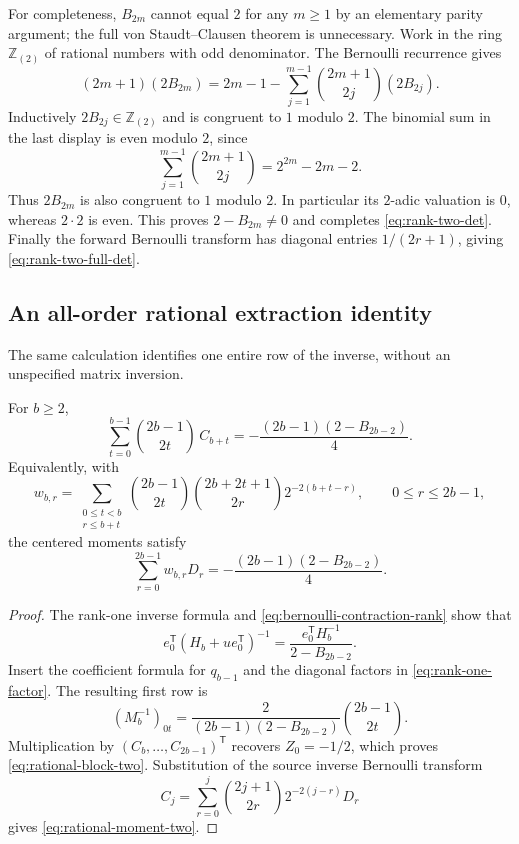 For completeness, $B_{2m}$ cannot equal $2$ for any $m\geq1$ by an
elementary parity argument; the full von Staudt--Clausen theorem is
unnecessary.  Work in the ring $\mathbb Z_{(2)}$ of rational numbers
with odd denominator.  The Bernoulli recurrence gives
\[
 (2m+1)(2B_{2m})
 =2m-1-\sum_{j=1}^{m-1}\binom{2m+1}{2j}(2B_{2j}).
\]
Inductively $2B_{2j}\in\mathbb Z_{(2)}$ and is congruent to $1$
modulo $2$.  The binomial sum in the last display is even modulo
$2$, since
\[
 \sum_{j=1}^{m-1}\binom{2m+1}{2j}
 =2^{2m}-2m-2.
\]
Thus $2B_{2m}$ is also congruent to $1$ modulo $2$.  In particular
its $2$-adic valuation is $0$, whereas $2\cdot2$ is even.
This proves $2-B_{2m}\ne0$ and completes
\eqref{eq:rank-two-det}.  Finally the forward Bernoulli transform
has diagonal entries $1/(2r+1)$, giving
\eqref{eq:rank-two-full-det}.

\subsection{An all-order rational extraction identity}

The same calculation identifies one entire row of the inverse,
without an unspecified matrix inversion.

\begin{theorem}
\label{thm:rational-row-two}
For $b\geq2$,
\begin{equation}\label{eq:rational-block-two}
 \sum_{t=0}^{b-1}\binom{2b-1}{2t}\,C_{b+t}
 =-\frac{(2b-1)(2-B_{2b-2})}{4}.
\end{equation}
Equivalently, with
\begin{equation}\label{eq:moment-weights-two}
 w_{b,r}=\sum_{\substack{0\leq t<b\\r\leq b+t}}
 \binom{2b-1}{2t}\binom{2b+2t+1}{2r}
       2^{-2(b+t-r)},\qquad 0\leq r\leq2b-1,
\end{equation}
the centered moments satisfy
\begin{equation}\label{eq:rational-moment-two}
 \sum_{r=0}^{2b-1}w_{b,r}D_r
 =-\frac{(2b-1)(2-B_{2b-2})}{4}.
\end{equation}
\end{theorem}

\begin{proof}
The rank-one inverse formula and
\eqref{eq:bernoulli-contraction-rank} show that
\[
 e_0^{\mathsf T}(H_b+u e_0^{\mathsf T})^{-1}
 =\frac{e_0^{\mathsf T}H_b^{-1}}{2-B_{2b-2}}.
\]
Insert the coefficient formula for $q_{b-1}$ and the diagonal
factors in \eqref{eq:rank-one-factor}.  The resulting first row is
\begin{equation}\label{eq:inverse-first-row-two}
 (M_b^{-1})_{0t}=
 \frac{2}{(2b-1)(2-B_{2b-2})}\binom{2b-1}{2t}.
\end{equation}
Multiplication by $(C_b,\ldots,C_{2b-1})^{\mathsf T}$ recovers
$Z_0=-1/2$, which proves \eqref{eq:rational-block-two}.
Substitution of the source inverse Bernoulli transform
\[
 C_j=\sum_{r=0}^j\binom{2j+1}{2r}2^{-2(j-r)}D_r
\]
gives \eqref{eq:rational-moment-two}.
\end{proof}

